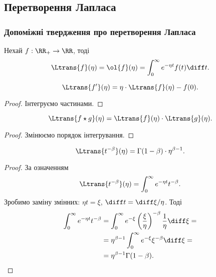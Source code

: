 \subsection{Перетворення Лапласа}

\subsubsection{Допоміжні твердження про перетворення Лапласа}

\begin{definition}
    Нехай $f: \RR_+ \to \RR$, тоді 
    \begin{equation}
        \Ltrans{f}(\eta) = \ol{f}(\eta) = \int_0^\infty e^{-\eta t} f(t) \diff t.
    \end{equation}
\end{definition}

\begin{lemma}
    \begin{equation}
        \Ltrans{f'}(\eta) = \eta \cdot \Ltrans{f}(\eta) - f(0).
    \end{equation}
\end{lemma}
\begin{proof}
    Інтегруємо частинами.
\end{proof}

\begin{lemma}
    \begin{equation}
        \Ltrans{f \star g}(\eta) = \Ltrans{f}(\eta) \cdot \Ltrans{g}(\eta).
    \end{equation}
\end{lemma}
\begin{proof}
    Змінюємо порядок інтегрування.
\end{proof}

\begin{lemma}
    \begin{equation}
        \Ltrans{t^{-\beta}}(\eta) = \Gamma(1 - \beta) \cdot \eta^{\beta - 1}.
    \end{equation}
\end{lemma}
\begin{proof}
    За означенням
    \begin{equation}
        \Ltrans{t^{-\beta}}(\eta) = \int_0^\infty e^{-\eta t} t^{-\beta}.
    \end{equation}
    Зробимо заміну змінних: $\eta t = \xi$, $\diff t = \diff \xi / \eta$. Тоді
    \begin{equation}
        \begin{aligned}
            \int_0^\infty e^{-\eta t} t^{-\beta} &= \int_0^\infty e^{-\xi} \left(\frac{\xi}{\eta}\right)^{-\beta} \frac{1}{\eta} \diff \xi = \\
            &= \eta^{\beta - 1} \int_0^\infty e^{-\xi} \xi^{-\beta} \diff \xi = \\
            &= \eta^{\beta - 1} \Gamma(1 - \beta).
        \end{aligned}
    \end{equation}
\end{proof}

